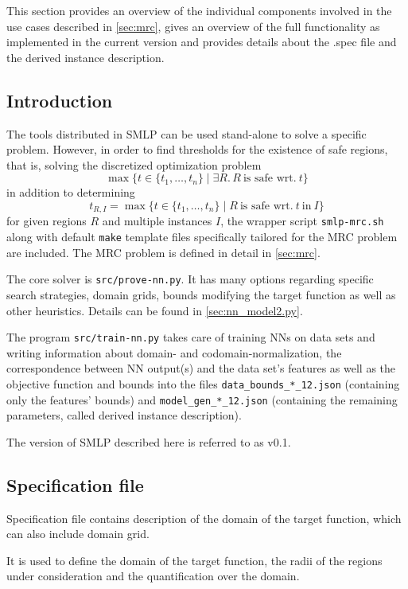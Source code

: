 \documentclass[a4paper,parskip=half]{article} %
\newcommand*\cmdstyle\texttt
\newcommand*\file\cmdstyle
\newcommand*\cmd[1]{\cmdstyle{\textcolor{red!85!black}{#1}}}
\newcommand*\Solver{Symbolic Machine Learning Prover\xspace}
\newcommand*\SolverAbbrvText{SMLP}
\newcommand*\SolverAbbrv{\SolverAbbrvText\xspace}
\newcommand*\SolverVersion{v0.1}
\newcommand*\progmrc{smlp-mrc.sh}
\newcommand*\provenn{prove-nn.py}
\newcommand*\trainnn{train-nn.py}
\begin{document}
This section provides an
overview of the individual components involved in the use cases described in
\cref{sec:mrc}, gives an overview of the full functionality as implemented
in the current version and provides details about the .spec file and
the derived instance description.

\subsection{Introduction}
The tools distributed in \SolverAbbrv can be used stand-alone to solve a
specific problem. However, in order to find thresholds for the existence of safe
regions, that is, solving the discretized optimization problem
\[ \max\{t\in\{t_1,\ldots,t_n\}\mid \exists R.\,R~\text{is safe wrt.}~t\} \]
in addition to determining
\[ t_{R,I}=\max\{t\in\{t_1,\ldots,t_n\}\mid R~\text{is safe wrt.}~t~\text{in}~I\} \]
for given regions $R$ and multiple instances $I$,
the wrapper script \cmd{\progmrc} along with default \cmd{make} template
files specifically tailored for the MRC problem are included.
The MRC problem is defined in detail in \cref{sec:mrc}.

The core solver is \cmd{src/\provenn}. It has many options regarding
specific search strategies, domain grids, bounds modifying the target function
as well as other heuristics. Details can be found in \cref{sec:nn_model2.py}.

The program \cmd{src/\trainnn} takes care of training NNs on data
sets and writing information about domain- and codomain-normalization, the
correspondence between NN output(s) and the data set's features as well as
the objective function and bounds into the files \file{data\_bounds\_*\_12.json}
(containing only the features' bounds) and \file{model\_gen\_*\_12.json}
(containing the remaining parameters, called derived instance description).

The version of \SolverAbbrv described here is referred to as \SolverVersion.


\subsection{Specification file}\label{sec:.spec}
Specification file contains description of the domain of the target function, which  can also include domain grid. 

It is used to define the domain of the target function, the radii of the
regions under consideration and the quantification over the domain.
\end{document}
